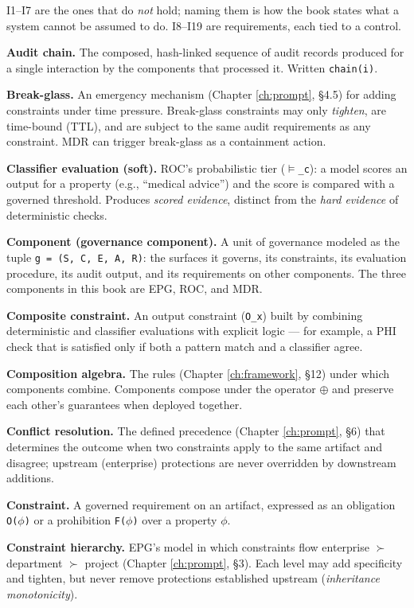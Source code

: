I1--I7 are the ones that do \emph{not} hold; naming them is how the book states what a
system cannot be assumed to do. I8--I19 are requirements, each tied to a control.

\textbf{Audit chain.} The composed, hash-linked sequence of audit records produced for
a single interaction by the components that processed it. Written \texttt{chain(i)}.

\textbf{Break-glass.} An emergency mechanism (Chapter \ref{ch:prompt}, \S{}4.5) for adding constraints
under time pressure. Break-glass constraints may only \emph{tighten}, are time-bound
(TTL), and are subject to the same audit requirements as any constraint. MDR can
trigger break-glass as a containment action.

\textbf{Classifier evaluation (soft).} ROC's probabilistic tier (\texttt{$\vDash$\_\allowbreak{}c}): a model scores
an output for a property (e.g., ``medical advice'') and the score is compared with a
governed threshold. Produces \emph{scored evidence}, distinct from the \emph{hard evidence}
of deterministic checks.

\textbf{Component (governance component).} A unit of governance modeled as the tuple
\texttt{g = (S, C, E, A, R)}: the surfaces it governs, its constraints, its evaluation
procedure, its audit output, and its requirements on other components. The three
components in this book are EPG, ROC, and MDR.

\textbf{Composite constraint.} An output constraint (\texttt{O\_\allowbreak{}x}) built by combining
deterministic and classifier evaluations with explicit logic --- for example, a
PHI check that is satisfied only if both a pattern match and a classifier agree.

\textbf{Composition algebra.} The rules (Chapter \ref{ch:framework}, \S{}12) under which components combine.
Components compose under the operator \texttt{$\oplus$} and preserve each other's guarantees
when deployed together.

\textbf{Conflict resolution.} The defined precedence (Chapter \ref{ch:prompt}, \S{}6) that determines the
outcome when two constraints apply to the same artifact and disagree; upstream
(enterprise) protections are never overridden by downstream additions.

\textbf{Constraint.} A governed requirement on an artifact, expressed as an obligation
\texttt{O($\phi$)} or a prohibition \texttt{F($\phi$)} over a property \texttt{$\phi$}.

\textbf{Constraint hierarchy.} EPG's model in which constraints flow enterprise $\succ$
department $\succ$ project (Chapter \ref{ch:prompt}, \S{}3). Each level may add specificity and tighten,
but never remove protections established upstream (\emph{inheritance monotonicity}).

